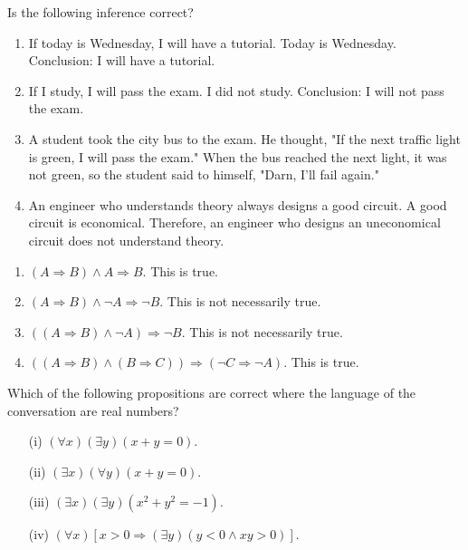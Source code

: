 \documentclass[11pt,paper=b5,footinclude,headinclude]{scrbook} %
\theoremstyle{remark}
\theoremstyle{definition} %
\theoremstyle{theorem} %
\newtheorem{ex}{Exercise\hypertarget{sol:\theex}}[chapter]
\begin{document}
    \begin{ex} Is the following inference correct?
    \begin{enumerate}[label=(\roman*)]
        \item If today is Wednesday, I will have a tutorial. Today is Wednesday. Conclusion: I will have a tutorial.


        \item If I study, I will pass the exam. I did not study. Conclusion: I will not pass the exam.


        \item A student took the city bus to the exam. He thought, "If the next traffic light is green, I will pass the exam." When the bus reached the next light, it was not green, so the student said to himself, "Darn, I'll fail again."

        \item An engineer who understands theory always designs a good circuit. A good circuit is economical. Therefore, an engineer who designs an uneconomical circuit does not understand theory.

    \end{enumerate}

\begin{sol}
    \begin{enumerate}[label=(\roman*)]
        \item $(A \Rightarrow B) \wedge A \Rightarrow B$. This is true.
        \item  $(A \Rightarrow B) \wedge \neg A \Rightarrow \neg B$. This is not necessarily true.
        \item $((A \Rightarrow B) \wedge \neg A) \Rightarrow \neg B$. This is not necessarily true.
        \item $((A \Rightarrow B) \wedge (B \Rightarrow C)) \Rightarrow (\neg C \Rightarrow \neg A)$. This is true.
    \end{enumerate}
\end{sol}

\end{ex} \begin{ex} Which of the following propositions are correct where the language of the conversation are real numbers?
\begin{enumerate}
\item[(i)] $(\forall x)(\exists y)(x+y=0)$.
\item[(ii)] $(\exists x)(\forall y)(x+y=0)$.
\item[(iii)] $(\exists x)(\exists y)(x^2+y^2 =-1)$.
\item[(iv)] $(\forall x)[x>0 \Rightarrow (\exists y)(y<0 \wedge xy>0)]$.
\end{enumerate}
\end{ex}
\end{document}
